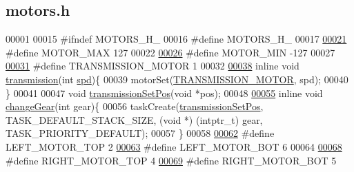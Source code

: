 \hypertarget{motors_8h_source}{}\subsection{motors.\+h}
\label{motors_8h_source}

\begin{DoxyCode}
00001 
00015 \textcolor{preprocessor}{#ifndef MOTORS\_H\_}
00016 \textcolor{preprocessor}{#define MOTORS\_H\_}
00017 
\hypertarget{motors_8h_source.tex_l00021}{}\hyperlink{motors_8h_a5cf14eeff6ae0a3163b61e2abcf1c6c0}{00021} \textcolor{preprocessor}{#define MOTOR\_MAX 127}
00022 
\hypertarget{motors_8h_source.tex_l00026}{}\hyperlink{motors_8h_a83ffb7cf4f639255103d5426aa0f8ac4}{00026} \textcolor{preprocessor}{#define MOTOR\_MIN -127}
00027 
\hypertarget{motors_8h_source.tex_l00031}{}\hyperlink{motors_8h_a7d8ac8902b66bb442bb27f9899aef13e}{00031} \textcolor{preprocessor}{#define TRANSMISSION\_MOTOR 1}
00032 
\hypertarget{motors_8h_source.tex_l00038}{}\hyperlink{motors_8h_aa1bbe2034fc14b835dd3d8c82f61135a}{00038} \textcolor{keyword}{inline} \textcolor{keywordtype}{void} \hyperlink{motors_8h_aa1bbe2034fc14b835dd3d8c82f61135a}{transmission}(\textcolor{keywordtype}{int} \hyperlink{opcontrol_8c_a642ce334330c8b0f6e33dd0a3fa65111}{spd})\{
00039     motorSet(\hyperlink{motors_8h_a7d8ac8902b66bb442bb27f9899aef13e}{TRANSMISSION\_MOTOR}, spd);
00040 \}
00041 
00047 \textcolor{keywordtype}{void} \hyperlink{motors_8h_aaab2334001d6f124f67862140b6872a0}{transmissionSetPos}(\textcolor{keywordtype}{void} *pos);
00048 
\hypertarget{motors_8h_source.tex_l00055}{}\hyperlink{motors_8h_a997340e460b7870c53c9a119c017b0cc}{00055} \textcolor{keyword}{inline} \textcolor{keywordtype}{void} \hyperlink{motors_8h_a997340e460b7870c53c9a119c017b0cc}{changeGear}(\textcolor{keywordtype}{int} gear)\{
00056     taskCreate(\hyperlink{motors_8h_aaab2334001d6f124f67862140b6872a0}{transmissionSetPos}, TASK\_DEFAULT\_STACK\_SIZE, (\textcolor{keywordtype}{void} *) (intptr\_t) gear, 
      TASK\_PRIORITY\_DEFAULT);
00057 \}
00058 
\hypertarget{motors_8h_source.tex_l00062}{}\hyperlink{motors_8h_a3e06fbce97caed16e0a0f27f544587af}{00062} \textcolor{preprocessor}{#define LEFT\_MOTOR\_TOP 2}
\hypertarget{motors_8h_source.tex_l00063}{}\hyperlink{motors_8h_a43691a92e03fa5319b14f01193f47b9a}{00063} \textcolor{preprocessor}{#define LEFT\_MOTOR\_BOT 6}
00064 
\hypertarget{motors_8h_source.tex_l00068}{}\hyperlink{motors_8h_a306c5923dd0328c4bfc09255de9d124c}{00068} \textcolor{preprocessor}{#define RIGHT\_MOTOR\_TOP 4}
\hypertarget{motors_8h_source.tex_l00069}{}\hyperlink{motors_8h_a85c904d091f71ba7fc53a446524b6c61}{00069} \textcolor{preprocessor}{#define RIGHT\_MOTOR\_BOT 5}

\end{DoxyCode}
